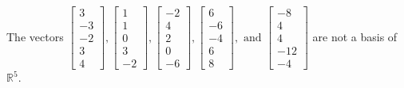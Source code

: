 \begin{exercise}
\begin{exerciseStatement}
  \end{exerciseStatement}
  \begin{exerciseAnswer}
   The vectors \(\left[\begin{array}{r}
3 \\
-3 \\
-2 \\
3 \\
4
\end{array}\right] , \left[\begin{array}{r}
1 \\
1 \\
0 \\
3 \\
-2
\end{array}\right] , \left[\begin{array}{r}
-2 \\
4 \\
2 \\
0 \\
-6
\end{array}\right] , \left[\begin{array}{r}
6 \\
-6 \\
-4 \\
6 \\
8
\end{array}\right] , \text{ and } \left[\begin{array}{r}
-8 \\
4 \\
4 \\
-12 \\
-4
\end{array}\right]\) 
  	 are not  a basis of \(\mathbb{R}^5\).
  


  \end{exerciseAnswer}
\end{exercise}